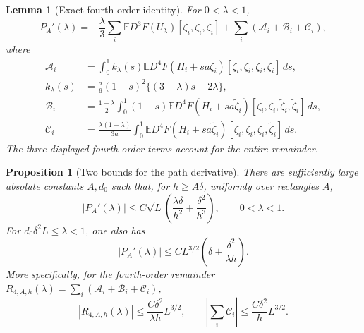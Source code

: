 \documentclass[11pt,a4paper]{article}
\newtheorem{proposition}{Proposition}
\newtheorem{lemma}{Lemma}
\theoremstyle{remark}
\newcommand{\E}{\mathbb E}
\newcommand{\dd}{\,d}
\begin{document}
\begin{lemma}[Exact fourth-order identity]\label{an:lem:identity}
For \(0<\lambda<1\),
\begin{equation}
 P_A'(\lambda)
 =-\frac\lambda3\sum_i\E D^3F(U_\lambda)
                    [\zeta_i,\zeta_i,\zeta_i]
       +\sum_i(\mathcal A_i+\mathcal B_i+\mathcal C_i),
 \label{an:fourth-identity}
\end{equation}
where
\begin{align}
 \mathcal A_i
 &=\int_0^1 k_\lambda(s)
       \E D^4F(H_i+sa\zeta_i)
                 [\zeta_i,\zeta_i,\zeta_i,\zeta_i]\dd s,
 \label{an:A}\\
 k_\lambda(s)
 &=\frac a6(1-s)^2\{(3-\lambda)s-2\lambda\},
 \label{an:kernel}\\
 \mathcal B_i
 &=\frac{1-\lambda}{2}\int_0^1(1-s)
       \E D^4F(H_i+sa\widetilde\zeta_i)
          [\zeta_i,\zeta_i,\widetilde\zeta_i,\widetilde\zeta_i]
       \dd s,
 \label{an:B}\\
 \mathcal C_i
 &=\frac{\lambda(1-\lambda)}{3a}\int_0^1
       \E D^4F(H_i+sa\widetilde\zeta_i)
          [\zeta_i,\zeta_i,\zeta_i,\widetilde\zeta_i]\dd s.
 \label{an:C}
\end{align}
The three displayed fourth-order terms account for the entire remainder.
\end{lemma}
\begin{proposition}[Two bounds for the path derivative]
\label{an:prop:derivative}
There are sufficiently large absolute constants \(A,d_0\) such that,
for \(h\ge A\delta\), uniformly over rectangles \(A\),
\begin{equation}
 |P_A'(\lambda)|
 \le C\sqrt L\left(\frac{\lambda\delta}{h^2}
                         +\frac{\delta^2}{h^3}\right),
 \qquad 0<\lambda<1.
 \label{an:early}
\end{equation}
For \(d_0\delta^2L\le\lambda<1\), one also has
\begin{equation}
 |P_A'(\lambda)|
 \le CL^{3/2}\left(\delta+\frac{\delta^2}{\lambda h}\right).
 \label{an:late}
\end{equation}
More specifically, for the fourth-order remainder
\(R_{4,A,h}(\lambda)=\sum_i(\mathcal A_i+\mathcal B_i+\mathcal C_i)\),
\begin{equation}
 |R_{4,A,h}(\lambda)|\le\frac{C\delta^2}{\lambda h}L^{3/2},
 \qquad
 \left|\sum_i\mathcal C_i\right|
       \le\frac{C\delta^2}{h}L^{3/2}.
 \label{an:remainder}
\end{equation}
\end{proposition}
\end{document}
